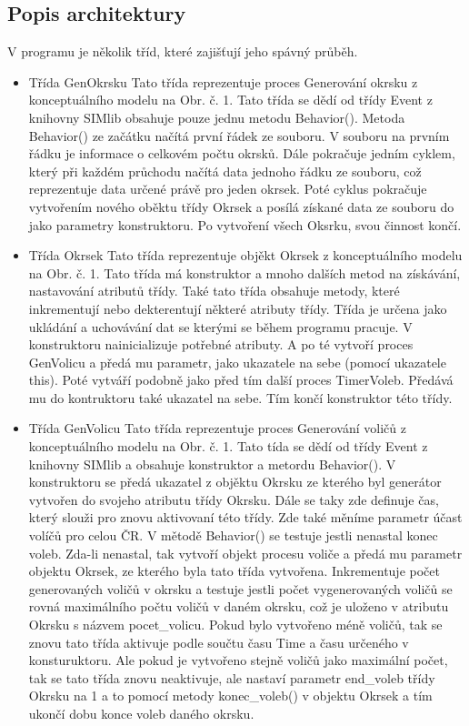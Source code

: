 \documentclass[12pt,a4paper,titlepage,final]{article}
\begin{document}
\subsection{Popis architektury}
V programu je několik tříd, které zajišťují jeho spávný průběh. 
 \begin{itemize}
\item Třída GenOkrsku
\subitem Tato třída reprezentuje proces Generování okrsku z konceptuálního modelu na Obr. č. 1. Tato třída se dědí od třídy Event z knihovny SIMlib obsahuje pouze jednu metodu Behavior(). Metoda Behavior() ze začátku načítá první řádek ze souboru. V souboru na prvním řádku je informace o celkovém počtu okrsků. Dále pokračuje jedním cyklem, který při každém průchodu načítá data jednoho řádku ze souboru, což reprezentuje data určené právě pro jeden okrsek. Poté cyklus pokračuje vytvořením nového oběktu třídy Okrsek a posílá získané data ze souboru do jako parametry konstruktoru. Po vytvoření všech Oksrku, svou činnost končí.

\item Třída Okrsek
\subitem Tato třída reprezentuje objěkt Okrsek z konceptuálního modelu na Obr. č. 1. Tato třída má konstruktor a mnoho dalších metod na získávání, nastavování atributů třídy. Také tato třída obsahuje metody, které inkrementují nebo dekterentují některé atributy třídy. Třída je určena jako ukládání a uchovávání dat se kterými se během programu pracuje. V konstruktoru nainicializuje potřebné atributy. A po té vytvoří proces GenVolicu a předá mu parametr, jako ukazatele na sebe (pomocí ukazatele this). Poté vytváří podobně jako před tím další proces TimerVoleb. Předává mu do kontruktoru také ukazatel na sebe. Tím končí konstruktor této třídy.

\item Třída GenVolicu
\subitem Tato třída reprezentuje proces Generování voličů z konceptuálního modelu na Obr. č. 1. Tato tída se dědí od třídy Event z knihovny SIMlib a obsahuje konstruktor a metordu Behavior(). V konstruktoru se předá ukazatel z objěktu Okrsku ze kterého byl generátor vytvořen do svojeho atributu třídy Okrsku. Dále se taky zde definuje čas, který slouži pro znovu aktivovaní této třídy. Zde také měníme parametr účast volíčů pro celou ČR. V mětodě Behavior() se testuje jestli nenastal konec voleb. Zda-li nenastal, tak vytvoří objekt procesu voliče a předá mu parametr objektu Okrsek, ze kterého byla tato třída vytvořena. Inkrementuje počet generovaných voličů v okrsku a testuje jestli počet vygenerovaných voličů se rovná maximálního počtu voličů v daném okrsku, což je uloženo v atributu Okrsku s názvem pocet\_volicu. Pokud bylo vytvořeno méně voličů, tak se znovu tato třída aktivuje podle součtu času Time a času určeného v konsturuktoru. Ale pokud je vytvořeno stejně voličů jako maximální počet, tak se tato třída znovu neaktivuje, ale nastaví parametr end\_voleb třídy Okrsku na 1 a to pomocí metody konec\_voleb() v objektu Okrsek a tím ukončí dobu konce voleb daného okrsku. 


\end{itemize}
\end{document}
